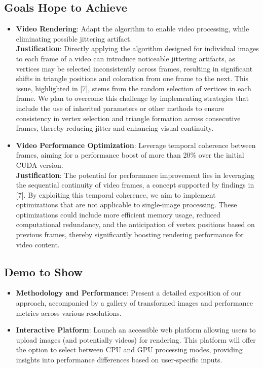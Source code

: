 \documentclass[12pt]{article}
\theoremstyle{definition}
\theoremstyle{plain}
\begin{document}
\subsection*{Goals Hope to Achieve}
\begin{itemize}
    \item \textbf{Video Rendering}: Adapt the algorithm to enable video processing, while eliminating possible jittering artifact. \\[4pt]
    \textbf{Justification}: Directly applying the algorithm designed for individual images to each frame of a video can introduce noticeable jittering artifacts, as vertices may be selected inconsistently across frames, resulting in significant shifts in triangle positions and coloration from one frame to the next. This issue, highlighted in [7], stems from the random selection of vertices in each frame. We plan to overcome this challenge by implementing strategies that include the use of inherited parameters or other methods to ensure consistency in vertex selection and triangle formation across consecutive frames, thereby reducing jitter and enhancing visual continuity.

    \item \textbf{Video Performance Optimization}: Leverage temporal coherence between frames, aiming for a performance boost of more than 20\% over the initial CUDA version.  \\[4pt]
    \textbf{Justification}: The potential for performance improvement lies in leveraging the sequential continuity of video frames, a concept supported by findings in [7]. By exploiting this temporal coherence, we aim to implement optimizations that are not applicable to single-image processing. These optimizations could include more efficient memory usage, reduced computational redundancy, and the anticipation of vertex positions based on previous frames, thereby significantly boosting rendering performance for video content.
    
\end{itemize}

\subsection*{Demo to Show}
\begin{itemize}
    \item \textbf{Methodology and Performance}: Present a detailed exposition of our approach, accompanied by a gallery of transformed images and performance metrics across various resolutions.
    \item \textbf{Interactive Platform}: Launch an accessible web platform allowing users to upload images (and potentially videos) for rendering. This platform will offer the option to select between CPU and GPU processing modes, providing insights into performance differences based on user-specific inputs.
\end{itemize}
\end{document}
